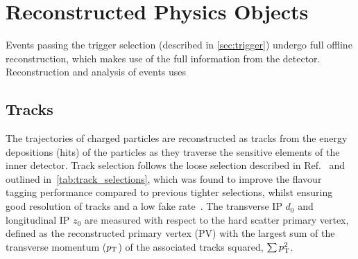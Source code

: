 









\section{Reconstructed Physics Objects}\label{sec:physics-objects}

Events passing the trigger selection (described in \cref{sec:trigger}) undergo full offline reconstruction, which makes use of the full information from the detector.
Reconstruction and analysis of events uses \cite{ATL-SOFT-PUB-2021-001}


\subsection{Tracks}\label{sec:tracks}

The trajectories of charged particles are reconstructed as tracks from the energy depositions (hits) of the particles as they traverse the sensitive elements of the inner detector.
Track selection follows the loose selection described in Ref.~\cite{ATL-PHYS-PUB-2020-014} and outlined in~\cref{tab:track_selections}, which was found to improve the flavour tagging performance compared to previous tighter selections, whilst ensuring good resolution of tracks and a low fake rate~\cite{PERF-2015-08}.
The transverse IP $d_0$ and longitudinal IP $z_0$ are measured with respect to the hard scatter primary vertex, defined as the reconstructed primary vertex (PV) with the largest sum of the transverse momentum ($p_{\text{T}}$) of the associated tracks squared, $\sum p_{\text{T}}^2$.

